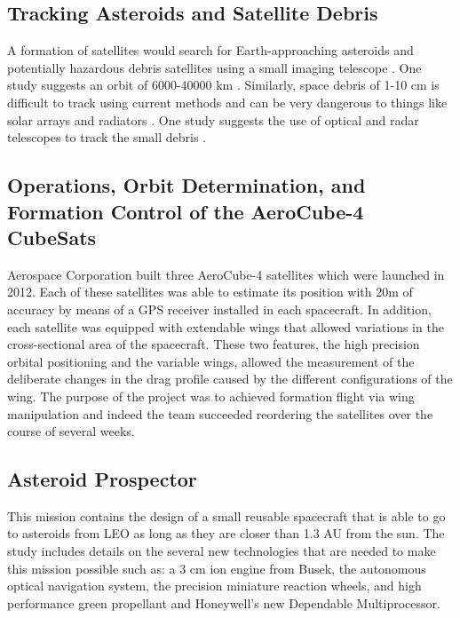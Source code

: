 \subsection{Tracking Asteroids and Satellite Debris }

A formation of satellites would search for Earth-approaching asteroids and potentially hazardous debris satellites using a small imaging telescope \cite{Ref:Carroll}. One study suggests an orbit of 6000-40000 km \cite{Ref:Leitch}. Similarly, space debris of 1-10 cm is difficult to track using current methods and can be very dangerous to things like solar arrays and radiators \cite{Ref:Guerrero}. One study suggests the use of optical and radar telescopes to track the small debris \cite{Ref:Tolkachev}.

\subsection{Operations, Orbit Determination, and Formation Control of the AeroCube-4 CubeSats}

Aerospace Corporation built three AeroCube-4 satellites which were launched in 2012. Each of these satellites was able
to estimate its position with 20m of accuracy by means of a GPS receiver
installed in each spacecraft. In addition, each satellite was equipped
with extendable wings that allowed variations in the cross-sectional
area of the spacecraft. These two features, the high precision orbital
positioning and the variable wings, allowed the measurement of the deliberate
changes in the drag profile caused by the different configurations
of the wing. The purpose of the project was to achieved formation
flight via wing manipulation and indeed the team succeeded reordering
the satellites over the course of several weeks.\cite{Gangestad_FF_AeroForces}

\subsection{Asteroid Prospector}

This mission contains the design of a small reusable spacecraft that
is able to go to asteroids from LEO as long as they are closer than
1.3 AU from the sun. The study includes details on the several new
technologies that are needed to make this mission possible such as:
a 3 cm ion engine from Busek, the autonomous optical navigation system,
the precision miniature reaction wheels, and high performance green
propellant and Honeywell's new Dependable Multiprocessor.\cite{Muelle_AsteroidProspector}


